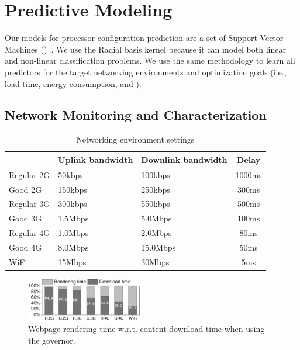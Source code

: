 

\section{Predictive Modeling}

Our models for processor configuration prediction are a set of Support Vector Machines (\SVMs)~\cite{vapnik1998statistical}. We use the
Radial basis kernel because it can model both linear and non-linear classification problems. We use the same methodology to learn all
predictors for the target networking environments and optimization goals (i.e., load time, energy consumption, and \EDP).


\subsection{Network Monitoring and Characterization}
\label{sec:networks}
\begin{table}[!t]
\caption{Networking environment settings}
\vspace{-3mm}
\scriptsize
\begin{center}
        \begin{tabular}{lp{2cm}p{2.5cm}c}
        \toprule
        &\textbf{Uplink bandwidth}&\textbf{Downlink bandwidth}&\textbf{Delay}\\
        \midrule
            \rowcolor[gray]{.92}Regular 2G                     &50kbps&100kbps&1000ms\\
            Good 2G                             &150kbps&250kbps&300ms\\
            \rowcolor[gray]{.92}Regular 3G      &300kbps&550kbps&500ms\\
            Good 3G                             &1.5Mbps&5.0Mbps&100ms\\
            \rowcolor[gray]{.92}Regular 4G      &1.0Mbps&2.0Mbps&80ms\\
            Good 4G                             &8.0Mbps&15.0Mbps&50ms\\
            \rowcolor[gray]{.92}WiFi            &15Mbps&30Mbps&5ms\\
        \bottomrule
        \end{tabular}
\end{center}
\label{tab:networkDetails}
\vspace{-5mm}
\end{table}

\begin{figure}[!t]
\begin{center}
\includegraphics[width=0.45\textwidth]{figure/network.pdf}
\end{center}
\vspace{-2mm}
\caption{Webpage rendering time w.r.t. content download time when using the \Interactive governor.}
\vspace{-4mm}
\label{fig:latency}
\end{figure}


